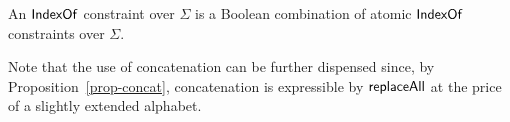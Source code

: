 {\begin{definition}
	An $\mathsf{IndexOf}$ constraint over $\Sigma$ is a Boolean combination of atomic $\mathsf{IndexOf}$ constraints over $\Sigma$.
\end{definition}

%	


%	

 
 Note that the use of concatenation can be further dispensed since, by Proposition~\ref{prop-concat},   concatenation is expressible by $\mathsf{replaceAll}$ at the price of a slightly extended alphabet.  






}
